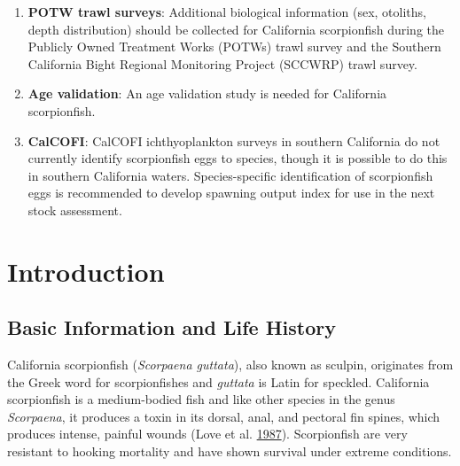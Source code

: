 \documentclass[12pt,]{article}
\begin{document}
\begin{enumerate}
\item \textbf{POTW trawl surveys}: Additional biological information 
(sex, otoliths, depth distribution) should be collected for California 
scorpionfish during the Publicly Owned Treatment Works (POTWs) trawl 
survey and the Southern California Bight Regional Monitoring Project 
(SCCWRP) trawl survey.

\item \textbf{Age validation}: An age validation study is needed for 
California scorpionfish.


\item \textbf{CalCOFI}: CalCOFI ichthyoplankton surveys in southern California 
do not currently identify scorpionfish eggs to species, though it is possible to 
do this in southern California waters. Species-specific identification of 
scorpionfish eggs is recommended to develop spawning output index for use in 
the next stock assessment.



\end{enumerate}

\FloatBarrier

\newpage

\renewcommand{\thefigure}{\arabic{figure}}
\renewcommand{\thetable}{\arabic{table}}

\setcounter{figure}{0} \setcounter{table}{0}


\section{Introduction}\label{introduction}

\subsection{Basic Information and Life
History}\label{basic-information-and-life-history}

California scorpionfish (\emph{Scorpaena guttata}), also known as
sculpin, originates from the Greek word for scorpionfishes and
\emph{guttata} is Latin for speckled. California scorpionfish is a
medium-bodied fish and like other species in the genus \emph{Scorpaena},
it produces a toxin in its dorsal, anal, and pectoral fin spines, which
produces intense, painful wounds (Love et al.
\protect\hyperlink{ref-Love1987}{1987}). Scorpionfish are very resistant
to hooking mortality and have shown survival under extreme conditions.
\end{document}
